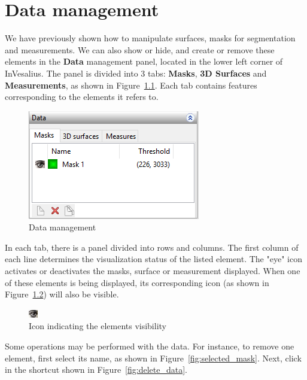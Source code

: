\chapter{Data management}

We have previously shown how to manipulate surfaces, masks for segmentation and measurements. We can also show or hide, and create or remove these elements in the \textbf{Data} management panel, located in the lower left corner of InVesalius. The panel is divided into 3 tabs: \textbf{Masks}, \textbf{3D Surfaces} and \textbf{Measurements}, as shown in Figure~\ref{fig:volumetric_data}. Each tab contains features corresponding to the elements it refers to.

\begin{figure}[!htb]
\centering
\includegraphics[scale=0.7]{../user_guide_figures/invesalius_screen/painel_mask_manager_en.png}
\caption{Data management}
\label{fig:volumetric_data}
\end{figure}

In each tab, there is a panel divided into rows and columns. The first column of each line determines the visualization status of the listed element. The "eye" icon activates or deactivates the masks, surface or measurement displayed. When one of these elements is being displayed, its corresponding icon (as shown in Figure~\ref{fig:disable_mask}) will also be visible.

\newpage

\begin{figure}[!htb]
\centering
\includegraphics[scale=0.9]{../user_guide_figures/invesalius_screen/eye.jpg}
\caption{Icon indicating the elements visibility}
\label{fig:disable_mask}
\end{figure}

Some operations may be performed with the data. For instance, to remove one element, first select its name, as shown in Figure~\ref{fig:selected_mask}. Next, click in the shortcut shown in Figure~\ref{fig:delete_data}.

